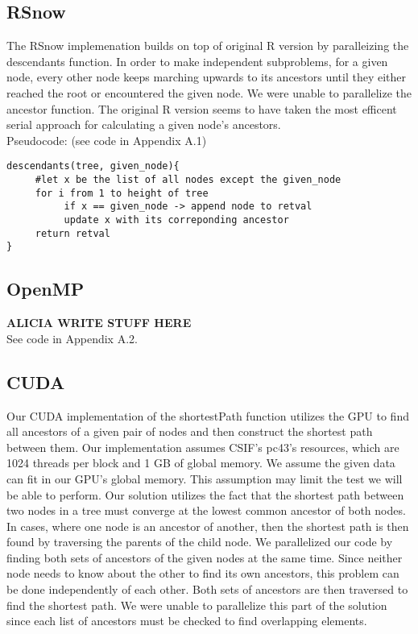 \documentclass[11pt,letterpaper]{article}
\begin{document}
\subsection{RSnow}
The RSnow implemenation builds on top of original R version by paralleizing the descendants function. 
In order to make independent subproblems, for a given node, every other node keeps marching upwards to its ancestors until they either reached the root or encountered the given node. 
We were unable to parallelize the ancestor function. The original R version seems to have taken the most efficent serial approach for calculating a given node's ancestors. \\

Pseudocode: (see code in Appendix A.1)
\begin{lstlisting}[style=MyR]
descendants(tree, given_node){
     #let x be the list of all nodes except the given_node
     for i from 1 to height of tree
          if x == given_node -> append node to retval
          update x with its correponding ancestor
     return retval
}
\end{lstlisting}

\subsection{OpenMP}
\textbf{ALICIA WRITE STUFF HERE}\\

See code in Appendix A.2.\\

\subsection{CUDA}
Our CUDA implementation of the shortestPath function utilizes the GPU to find all ancestors of a given pair of nodes and then construct the shortest path between them. 
Our implementation assumes CSIF's pc43's resources, which are 1024 threads per block and 1 GB of global memory. We assume the given data can fit in our GPU’s global memory. 
This assumption may limit the test we will be able to perform. 
Our solution utilizes the fact that the shortest path between two nodes in a tree must converge at the lowest common ancestor of both nodes. 
In cases, where one node is an ancestor of another, then the shortest path is then found by traversing the parents of the child node. 
We parallelized our code by finding both sets of ancestors of the given nodes at the same time. 
Since neither node needs to know about the other to find its own ancestors, this problem can be done independently of each other. 
Both sets of ancestors are then traversed to find the shortest path. 
We were unable to parallelize this part of the solution since each list of ancestors must be checked to find overlapping elements. \\
\end{document}
